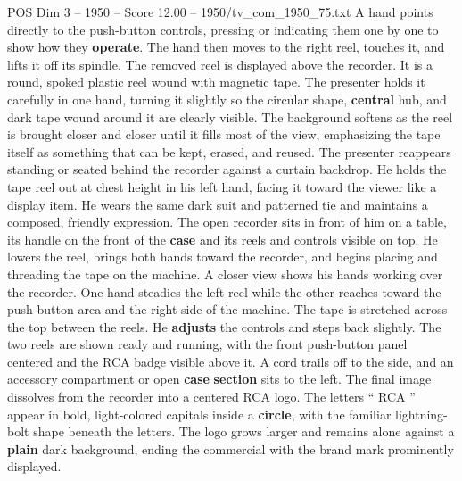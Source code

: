 \begin{textsample}{POS Dim 3 – 1950 – Score 12.00 – 1950/tv\_com\_1950\_75.txt}
A hand points directly to the push-button controls, pressing or indicating them one by one to show how they \textbf{operate}.
The hand then moves to the right reel, touches it, and lifts it off its spindle.
The removed reel is displayed above the recorder.
It is a round, spoked plastic reel wound with magnetic tape.
The presenter holds it carefully in one hand, turning it slightly so the circular shape, \textbf{central} hub, and dark tape wound around it are clearly visible.
The background softens as the reel is brought closer and closer until it fills most of the view, emphasizing the tape itself as something that can be kept, erased, and reused.
The presenter reappears standing or seated behind the recorder against a curtain backdrop.
He holds the tape reel out at chest height in his left hand, facing it toward the viewer like a display item.
He wears the same dark suit and patterned tie and maintains a composed, friendly expression.
The open recorder sits in front of him on a table, its handle on the front of the \textbf{case} and its reels and controls visible on top.
He lowers the reel, brings both hands toward the recorder, and begins placing and threading the tape on the machine.
A closer view shows his hands working over the recorder.
One hand steadies the left reel while the other reaches toward the push-button area and the right side of the machine.
The tape is stretched across the top between the reels.
He \textbf{adjusts} the controls and steps back slightly.
The two reels are shown ready and running, with the front push-button panel centered and the RCA badge visible above it.
A cord trails off to the side, and an accessory compartment or open \textbf{case} \textbf{section} sits to the left.
The final image dissolves from the recorder into a centered RCA logo.
The letters “ RCA ” appear in bold, light-colored capitals inside a \textbf{circle}, with the familiar lightning-bolt shape beneath the letters.
The logo grows larger and remains alone against a \textbf{plain} dark background, ending the commercial with the brand mark prominently displayed.

\end{textsample}
